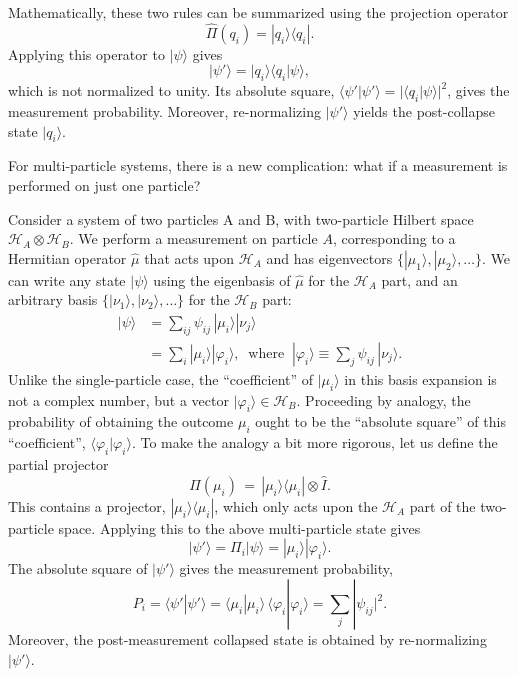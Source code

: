 \documentclass[pra,12pt]{revtex4}
\begin{document}
Mathematically, these two rules can be summarized using the projection
operator
$$\hat{\Pi}(q_i) = |q_i\rangle\langle q_i|.$$
Applying this operator to $|\psi\rangle$ gives
$$|\psi'\rangle = |q_i\rangle \langle q_i|\psi\rangle,$$
which is not normalized to unity.  Its absolute square,
$\langle\psi'|\psi'\rangle = |\langle q_i|\psi\rangle|^2$, gives the
measurement probability.  Moreover, re-normalizing $|\psi'\rangle$
yields the post-collapse state $|q_i\rangle$.

For multi-particle systems, there is a new complication: what if a
measurement is performed on just one particle?

Consider a system of two particles A and B, with two-particle Hilbert
space $\mathscr{H}_A \otimes \mathscr{H}_B$.  We perform a measurement
on particle $A$, corresponding to a Hermitian operator $\hat{\mu}$
that acts upon $\mathscr{H}_A$ and has eigenvectors $\{|\mu_1\rangle,
|\mu_2\rangle,\dots\}$.  We can write any state $|\psi\rangle$ using
the eigenbasis of $\hat{\mu}$ for the $\mathscr{H}_A$ part, and an
arbitrary basis $\{|\nu_1\rangle, |\nu_2\rangle,\dots\}$ for the
$\mathscr{H}_B$ part:
$$\begin{aligned}|\psi\rangle &= \sum_{ij} \psi_{ij}\, |\mu_i\rangle |\nu_j\rangle \\&= \sum_i |\mu_i\rangle |\varphi_i\rangle, \;\;\mathrm{where}\;\;|\varphi_i\rangle\equiv \sum_j \psi_{ij}\,|\nu_j\rangle.\end{aligned}$$
Unlike the single-particle case, the ``coefficient'' of
$|\mu_i\rangle$ in this basis expansion is not a complex number, but a
vector $|\varphi_i\rangle \in \mathscr{H}_B$.  Proceeding by analogy,
the probability of obtaining the outcome $\mu_i$ ought to be the
``absolute square'' of this ``coefficient'',
$\langle\varphi_i|\varphi_i\rangle$.  To make the analogy a bit more
rigorous, let us define the partial projector
$$\hat{\Pi}(\mu_i) \,=\, |\mu_i\rangle\langle \mu_i| \otimes  \hat{I}.$$
This contains a projector, $|\mu_i\rangle\langle \mu_i|$, which only
acts upon the $\mathscr{H}_A$ part of the two-particle space.
Applying this to the above multi-particle state gives
$$|\psi'\rangle = \Pi_i |\psi\rangle = |\mu_i\rangle |\varphi_i\rangle.$$
The absolute square of $|\psi'\rangle$ gives the measurement
probability,
$$P_i = \langle\psi'|\psi'\rangle = \langle \mu_i|\mu_i\rangle\, \langle \varphi_i|\varphi_i\rangle = \sum_j |\psi_{ij}|^2.$$
Moreover, the post-measurement collapsed state is obtained by
re-normalizing $|\psi'\rangle$.
\end{document}
